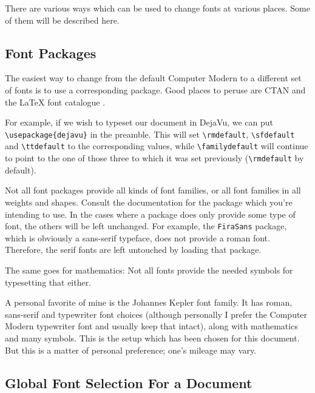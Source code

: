 \documentclass[a4paper,oneside,11pt]{article}
\newcommand\compar[2]{\texttt{\textbackslash #1\{#2\}}}
\newcommand\comm[1]{\texttt{\textbackslash#1}}
\newcommand\code[1]{\texttt{#1}}
\begin{document}
There  are  various  ways  which  can  be used  to  change  fonts  at  various
places. Some of them will be described here.


\subsection{Font Packages}
\label{subsec:font-packages}

The easiest way to change from the  default Computer Modern to a different set
of fonts  is to use  a corresponding package. Good  places to peruse  are CTAN
\cite{ctan:fonts} and the \LaTeX{} font catalogue \cite{tug:font-catalog}.

For  example, if  we  wish to  typeset  our  document in  DejaVu,  we can  put
\compar{usepackage}{dejavu}{} in the preamble. This will set \comm{rmdefault},
\comm{sfdefault}  and  \comm{ttdefault}  to the  corresponding  values,  while
\comm{familydefault} will continue to point to the one of those three to which
it was set previously (\comm{rmdefault} by default).

Not all font packages provide all kinds of font families, or all font families
in all  weights and  shapes. Consult the documentation  for the  package which
you're  intending to  use. In  the cases  where a  package  does only  provide
some  type of  font,  the  others will  be  left  unchanged. For example,  the
\code{FiraSans} package,  which is obviously  a sans-serif typeface,  does not
provide a roman font. Therefore, the serif fonts are left untouched by loading
that package.

The same  goes for mathematics: Not all  fonts provide the needed  symbols for
typesetting that either.

A personal favorite of mine is  the Johannes Kepler font family. It has roman,
sans-serif  and typewriter  font  choices (although  personally  I prefer  the
Computer  Modern typewriter  font and  usually keep  that intact),  along with
mathematics and many symbols. This is the setup which has been chosen for this
document. But this is a matter of personal preference; one's mileage may vary.


\subsection{Global Font Selection For a Document}
\label{subsec:fontsel:global}
\end{document}
